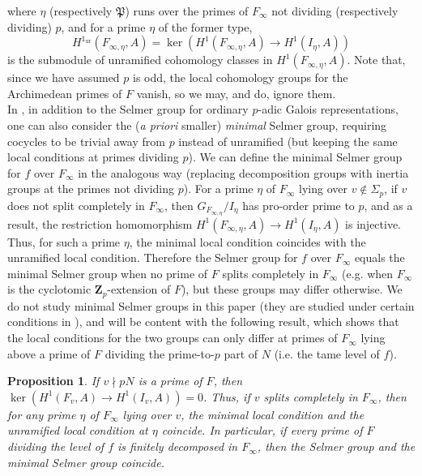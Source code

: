 \documentclass[12 pt]{amsart}
\theoremstyle{plain}
\newtheorem{prop}[thm]{Proposition}
\theoremstyle{definition}
\numberwithin{equation}{section}
\numberwithin{table}{section}
\begin{document}
where $\eta$ (respectively $\mathfrak{P}$) runs over the primes of $F_\infty$ not dividing (respectively dividing) $p$, and for a prime $\eta$ of the former type,
\begin{equation*}
H^1_\operatorname{ur}(F_{\infty,\eta},A)=\ker(H^1(F_{\infty,\eta},A)\to H^1(I_\eta,A))
\end{equation*}
is the submodule of unramified cohomology classes in $H^1(F_{\infty,\eta},A)$. Note that, since we have assumed $p$ is odd, the local cohomology groups for the Archimedean primes of $F$ vanish, so we may, and do, ignore them.\\%
\indent In \cite{GR89}, in addition to the Selmer group for ordinary $p$-adic Galois representations, one can also consider the (\emph{a priori} smaller) \emph{minimal} Selmer group, requiring cocycles to be trivial away from $p$ instead of unramified (but keeping the same local conditions at primes dividing $p$). We can define the minimal Selmer group for $f$ over $F_\infty$ in the analogous way (replacing decomposition groups with inertia groups at the primes not dividing $p$). For a prime $\eta$ of $F_\infty$ lying over $v\notin\Sigma_p$, if $v$ does not split completely in $F_\infty$, then $G_{F_{\infty,\eta}}/I_\eta$ has pro-order prime to $p$, and as a result, the restriction homomorphism $H^1(F_{\infty,\eta},A)\rightarrow H^1(I_\eta,A)$ is injective. Thus, for such a prime $\eta$, the minimal local condition coincides with the unramified local condition. Therefore the Selmer group for $f$ over $F_\infty$ equals the minimal Selmer group when no prime of $F$ splits completely in $F_\infty$ (e.g. when $F_\infty$ is the cyclotomic $\mathbf{Z}_p$-extension of $F$), but these groups may differ otherwise. We do not study minimal Selmer groups in this paper (they are studied under certain conditions in \cite{PW11}), and will be content with the following result, which shows that the local conditions for the two groups can only differ at primes of $F_\infty$ lying above a prime of $F$ dividing the prime-to-$p$ part of $N$ (i.e. the tame level of $f$).
\begin{prop}
\label{strict-Greenberg}
If $v\nmid pN$ is a prime of $F$, then $\ker(H^1(F_v,A)\rightarrow H^1(I_v,A))=0$. Thus, if $v$ splits completely in $F_\infty$, then for any prime $\eta$ of $F_\infty$ lying over $v$, the minimal local condition and the unramified local condition at $\eta$ coincide. In particular, if every prime of $F$ dividing the level of $f$ is finitely decomposed in $F_\infty$, then the Selmer group and the minimal Selmer group coincide.
\end{prop}
\end{document}
